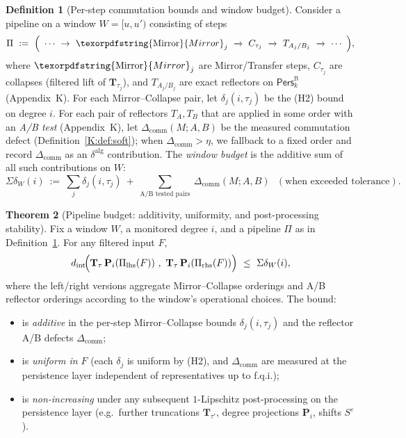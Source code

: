 \documentclass[11pt]{article}
\numberwithin{equation}{section}
\theoremstyle{plain}
\theoremstyle{definition}
\theoremstyle{remark}
\DeclareRobustCommand{\hyp}{\nobreakdash-}
\newcommand{\Pers}{\mathsf{Pers}}
\theoremstyle{plain}
\theoremstyle{definition}
\numberwithin{equation}{section}
\newtheorem{theorem}{Theorem}[section]
\theoremstyle{definition}
\newtheorem{definition}[theorem]{Definition}
\DeclareRobustCommand{\Mirror}{\texorpdfstring{\ensuremath{\operatorname{Mirror}}}{Mirror}}
\numberwithin{equation}{section}
\theoremstyle{plain}
\theoremstyle{definition}
\theoremstyle{remark}
\providecommand{\n}{\unskip\space}
\begin{document}
\begin{definition}[Per-step commutation bounds and window budget]\label{L:def:budget}
Consider a pipeline on a window \(W=[u,u')\) consisting of steps
\[
\Pi\ :=\ \Big(\ \cdots\ \rightarrow\ \Mirror_j\ \xrightarrow{}\ C_{\tau_j}\ \xrightarrow{}\ T_{A_j/B_j}\ \xrightarrow{}\ \cdots\ \Big),
\]
where \(\Mirror_j\) are Mirror/Transfer steps, \(C_{\tau_j}\) are collapses (filtered lift of \(\mathbf{T}_{\tau_j}\)), and \(T_{A_j/B_j}\) are exact reflectors on \(\Pers^{\mathrm{ft}}_k\) (Appendix~K). For each Mirror–Collapse pair, let \(\delta_j(i,\tau_j)\) be the (H2) bound on degree \(i\). For each pair of reflectors \(T_A,T_B\) that are applied in some order with an \emph{A/B test} (Appendix~K), let \(\Delta_{\mathrm{comm}}(M;A,B)\) be the measured commutation defect (Definition~\ref{K:def:soft}); when \(\Delta_{\mathrm{comm}}>\eta\), we fallback to a fixed order and record \(\Delta_{\mathrm{comm}}\) as an \(\delta^{\mathrm{alg}}\) contribution. The \emph{window budget} is the additive sum of all such contributions on \(W\):
\[
\Sigma\delta_W(i)\ :=\ \sum_{j}\delta_j(i,\tau_j)\ +\ \sum_{\text{A/B tested pairs}}\ \Delta_{\mathrm{comm}}(M;A,B)\ \ \ (\text{when exceeded tolerance}).
\]
\end{definition}

\begin{theorem}[Pipeline budget: additivity, uniformity, and post-processing stability]\label{L:thm:budget}
Fix a window \(W\), a monitored degree \(i\), and a pipeline \(\Pi\) as in Definition~\ref{L:def:budget}. For any filtered input \(F\),
\[
d_{\mathrm{int}}\!\Big(
       \mathbf{T}_\tau\,\mathbf{P}_i(\Pi_{\text{lhs}}(F))\ ,\ 
       \mathbf{T}_\tau\,\mathbf{P}_i(\Pi_{\text{rhs}}(F))\n  \Big)\ \le\ \Sigma\delta_W(i),
\]
where the left/right versions aggregate Mirror–Collapse orderings and A/B reflector orderings according to the window’s operational choices. The bound:
\begin{itemize}\itemsep0.2em
  \item is \emph{additive} in the per-step Mirror–Collapse bounds \(\delta_j(i,\tau_j)\) and the reflector A/B defects \(\Delta_{\mathrm{comm}}\);
  \item is \emph{uniform in \(F\)} (each \(\delta_j\) is uniform by (H2), and \(\Delta_{\mathrm{comm}}\) are measured at the persistence layer independent of representatives up to f.q.i.);
  \item is \emph{non-increasing} under any subsequent \(1\)\hyp Lipschitz post\hyp processing on the persistence layer (e.g.\ further truncations \(\mathbf{T}_{\tau'}\), degree projections \(\mathbf{P}_i\), shifts \(S^\varepsilon\)).
\end{itemize}
\end{theorem}
\end{document}
